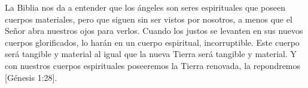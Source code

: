 La Biblia nos da a entender que los ángeles son seres espirituales que poseen cuerpos materiales, pero que siguen sin ser vistos por nosotros, a menos que el Señor abra nuestros ojos para verlos. Cuando los justos se levanten en sus nuevos cuerpos glorificados, lo harán en un cuerpo espiritual, incorruptible. Este cuerpo será tangible y material al igual que la nueva Tierra será tangible y material. Y con nuestros cuerpos espirituales poseeremos la Tierra renovada, la repondremos [Génesis 1:28].




% 
